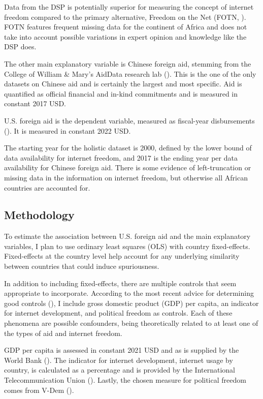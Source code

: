 \documentclass{article}
\begin{document}
Data from the DSP is potentially superior for measuring the concept of internet freedom compared to the primary alternative, Freedom on the Net (FOTN, \cite{house2022}). FOTN features frequent missing data for the continent of Africa and does not take into account possible variations in expert opinion and knowledge like the DSP does.

The other main explanatory variable is Chinese foreign aid, stemming from the College of William \& Mary's AidData research lab (\cite{custer2021}). This is the one of the only datasets on Chinese aid and is certainly the largest and most specific. Aid is quantified as official financial and in-kind commitments and is measured in constant 2017 USD.

U.S. foreign aid is the dependent variable, measured as fiscal-year disbursements (\cite{government2022e}). It is measured in constant 2022 USD.

The starting year for the holistic dataset is 2000, defined by the lower bound of data availability for internet freedom, and 2017 is the ending year per data availability for Chinese foreign aid. There is some evidence of left-truncation or missing data in the information on internet freedom, but otherwise all African countries are accounted for.

\subsection*{Methodology}
To estimate the association between U.S. foreign aid and the main explanatory variables, I plan to use ordinary least squares (OLS) with country fixed-effects. Fixed-effects at the country level help account for any underlying similarity between countries that could induce spuriousness.

In addition to including fixed-effects, there are multiple controls that seem appropriate to incorporate. According to the most recent advice for determining good controls (\cite{cinelli2022}), I include gross domestic product (GDP) per capita, an indicator for internet development, and political freedom as controls. Each of these phenomena are possible confounders, being theoretically related to at least one of the types of aid and internet freedom. 

GDP per capita is assessed in constant 2021 USD and as is supplied by the World Bank (\cite{bank2022}). The indicator for internet development, internet usage by country, is calculated as a percentage and is provided by the International Telecommunication Union (\cite{itu2022}). Lastly, the chosen measure for political freedom comes from V-Dem (\cite{coppedge2022a}).
\end{document}
